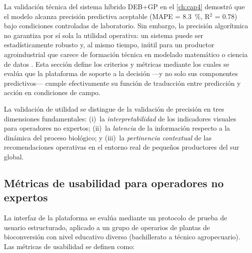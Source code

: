 
La validación técnica del sistema híbrido DEB+GP en el \cref{ch:cap4} demostró que el modelo alcanza precisión predictiva aceptable (MAPE = \num{8.3}~\%, R$^2$ = \num{0.78}) bajo condiciones controladas de laboratorio. Sin embargo, la precisión algorítmica no garantiza por sí sola la utilidad operativa: un sistema puede ser estadísticamente robusto y, al mismo tiempo, inútil para un productor agroindustrial que carece de formación técnica en modelado matemático o ciencia de datos \parencite{kamilarisReviewPracticeBig2017}. Esta sección define los criterios y métricas mediante los cuales se evalúa que la plataforma de soporte a la decisión —y no solo sus componentes predictivos— cumple efectivamente su función de traducción entre predicción y acción en condiciones de campo.

La validación de utilidad se distingue de la validación de precisión en tres dimensiones fundamentales: (i)~la \textit{interpretabilidad} de los indicadores visuales para operadores no expertos; (ii)~la \textit{latencia} de la información respecto a la dinámica del proceso biológico; y (iii)~la \textit{pertinencia contextual} de las recomendaciones operativas en el entorno real de pequeños productores del sur global.

\subsection{Métricas de usabilidad para operadores no expertos}
\label{subsec:cap5_usabilidad}

La interfaz de la plataforma se evalúa mediante un protocolo de prueba de usuario estructurado, aplicado a un grupo de operarios de plantas de bioconversión con nivel educativo diverso (bachillerato a técnico agropecuario). Las métricas de usabilidad se definen como:

